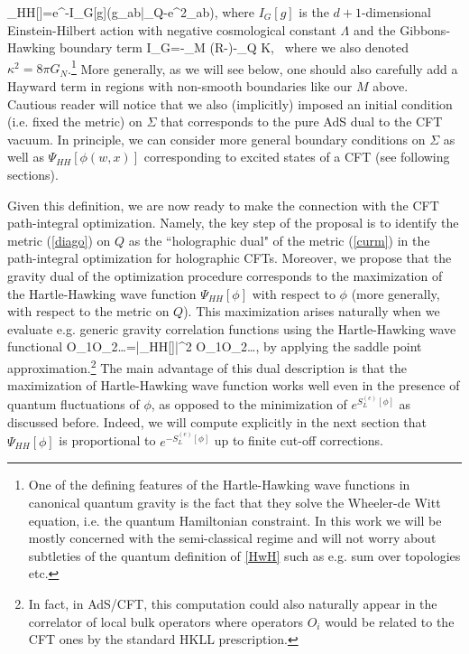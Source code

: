 \documentclass[a4paper,12pt]{article}
\begin{document}
\ba
\Psi_{HH}[\phi]=\int [Dg_{\mu\nu}] e^{-I_G[g]}\delta(g_{ab}|_Q-e^{2\phi}\delta_{ab}), \label{HwH}
\ea
where $I_G[g]$ is the $d+1$-dimensional Einstein-Hilbert action with negative cosmological constant $\Lambda$ and the Gibbons-Hawking boundary term
\ba
I_G\!=\!-\!\int_{M}\! (R\!-\Lambda)\!-\!\!\int_{Q\cup \Sigma}\! K,~
 \label{actionM}
\ea
where we also denoted $\kappa^2=8\pi G_N$.\footnote{One of the defining features of the Hartle-Hawking wave functions in canonical quantum gravity is the fact that they solve the Wheeler-de Witt equation, i.e. the quantum Hamiltonian constraint. In this work we will be mostly concerned with the semi-classical regime and will not worry about subtleties of the quantum definition of \eqref{HwH} such as e.g. sum over topologies etc.} More generally, as we will see below, one should also carefully add a Hayward term in regions with non-smooth boundaries like our $M$ above. \\
Cautious reader will notice that we also (implicitly) imposed an initial condition (i.e. fixed the metric) on $\Sigma$ that corresponds to the pure AdS dual to the CFT vacuum. In principle, we can consider more general boundary conditions on $\Sigma$ as well as $\Psi_{HH}[\phi(w,x)]$ corresponding to excited states of a CFT (see following sections). 

Given this definition, we are now ready to make the connection with the CFT path-integral optimization.
Namely, the key step of the proposal \cite{Boruch:2020wax} is to identify the metric (\ref{diago}) on $Q$ as the ``holographic dual" of the metric (\ref{curm}) in the path-integral optimization for holographic CFTs. Moreover, we propose that the gravity dual of the optimization procedure corresponds to the maximization of  the Hartle-Hawking wave function $\Psi_{HH}[\phi]$ with respect to $\phi$ (more generally, with respect to the metric on $Q$). This maximization arises naturally when we evaluate e.g. generic gravity correlation functions using the Hartle-Hawking wave functional
\ba
\la O_1O_2\ldots\lb =\int [D\phi] |\Psi_{HH}[\phi]|^2 O_1O_2\ldots,  \label{corhh}
\ea
by applying the saddle point approximation.\footnote{In fact, in AdS/CFT, this computation could also naturally appear in the correlator of local bulk operators where operators $O_i$ would be related to the CFT ones by the standard HKLL prescription.} The main advantage of this dual description is that the maximization of Hartle-Hawking wave function works well even in the presence of quantum fluctuations of $\phi$, as opposed to the minimization of $e^{S^{(e)}_L[\phi]}$ as discussed before. Indeed, we will compute explicitly in the next section that $\Psi_{HH}[\phi]$ is proportional to $e^{-S^{(e)}_L[\phi]}$ up to finite cut-off corrections.
 
\end{document}
